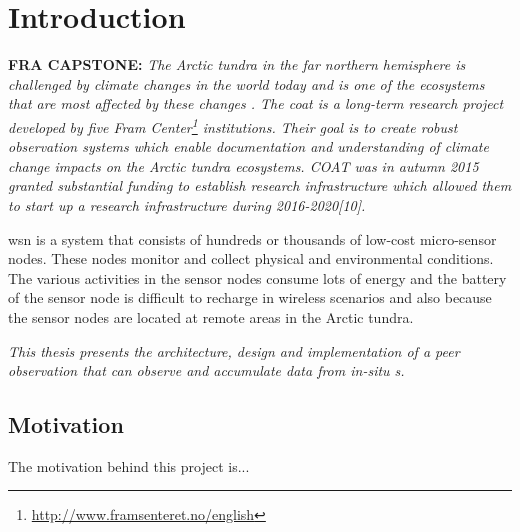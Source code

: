 \documentclass[USenglish]{uit-thesis}
\begin{document}
\tableofcontents



\printglossary


\mainmatter

\chapter{Introduction}
\textbf{FRA CAPSTONE:}
\textit{The Arctic tundra in the far northern hemisphere is challenged by climate changes in the world today and is one of the ecosystems that are most affected by these changes \cite{coat2016}. The \gls{coat} is a long-term research project developed by five Fram Center\footnote{\url{http://www.framsenteret.no/english}} institutions. Their goal is to create robust observation systems which enable documentation and understanding of climate change impacts on the Arctic tundra ecosystems. COAT was in autumn 2015 granted substantial funding to establish research infrastructure which allowed them to start up a research infrastructure during 2016-2020[10].}


\gls{wsn} is a system that consists of hundreds or thousands of low-cost micro-sensor nodes. These nodes monitor and collect physical and environmental conditions. The various activities  in the sensor nodes consume lots of energy and the battery of the sensor node is difficult to recharge in wireless scenarios and also because the sensor nodes are located at remote areas in the Arctic tundra.



\textit{This thesis presents the architecture, design and implementation of a peer observation that can observe and accumulate data from in-situ s.}

\section{Motivation}
The motivation behind this project is...
\end{document}
